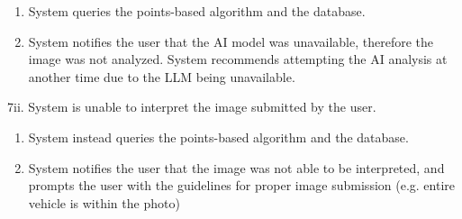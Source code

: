 \documentclass[]{article}
\begin{document}
\begin{enumerate}[{\bf {BE}1.}]
		\begin{enumerate}[{7i}.1]
			\item System queries the points-based algorithm and the database.
			\item System notifies the user that the AI model was unavailable, therefore the image was not analyzed.
			System recommends attempting the AI analysis at another time due to the LLM being unavailable. 
		\end{enumerate}
		7ii. System is unable to interpret the image submitted by the user.
		\begin{enumerate}[{7ii}.1]
			\item System instead queries the points-based algorithm and the database.
			\item System notifies the user that the image was not able to be interpreted, and prompts the user with the guidelines for proper image submission (e.g. entire vehicle is within the photo)
		\end{enumerate}


\end{enumerate}
\end{document}
